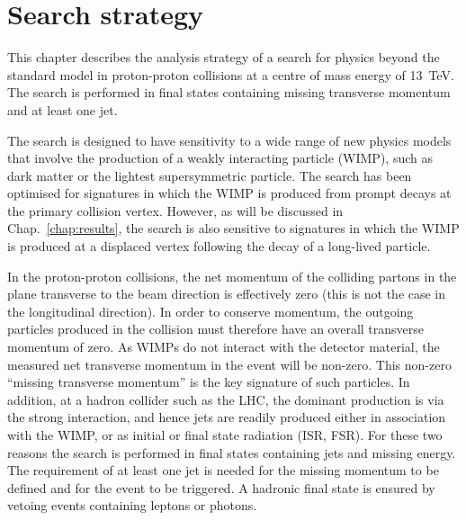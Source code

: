 \chapter{Search strategy}
\label{chap:analysis}

This chapter describes the analysis strategy of a search for physics 
beyond the standard model in proton-proton collisions at a centre of mass 
energy of 13~TeV. The search is performed in final states containing missing 
transverse momentum and at least one jet. 

The search is designed to have sensitivity to a wide range of new physics 
models that involve the production of a weakly interacting 
particle (WIMP), such as dark matter or the lightest supersymmetric particle. 
The search has been optimised for signatures in which the WIMP is produced from 
prompt decays at the primary collision vertex. However, as will be discussed in 
Chap.~\ref{chap:results}, the search is also sensitive to signatures in which 
the WIMP is produced at a displaced vertex following the decay of a long-lived 
particle. %

In the proton-proton collisions, the net momentum of the colliding partons in 
the plane transverse to the beam direction is effectively zero (this is not the 
case in the longitudinal direction). In order to conserve 
momentum, the 
outgoing particles produced in the collision must therefore have an overall 
transverse momentum of zero. As WIMPs do not interact with the detector 
material, the measured net transverse momentum in the event will be non-zero. 
This non-zero ``missing transverse momentum'' is the key signature of such 
particles. In addition, at a hadron collider such as the LHC, the dominant 
production is via the strong interaction, and hence jets are readily produced 
either in association with the WIMP, or as initial or final state radiation 
(ISR, FSR). For these two reasons the search is performed in final states 
containing jets and missing energy. The requirement of at least one jet is 
needed for the missing momentum to be defined and for the event to be 
triggered. A hadronic final state is ensured by vetoing events containing 
leptons or photons.

